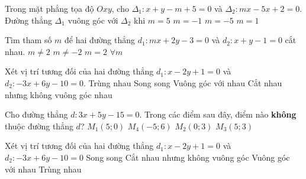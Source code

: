 \begin{ex}%
	Trong mặt phẳng tọa độ $Oxy$, cho $ \Delta_1\colon x+y-m+5=0 $ và $ \Delta_2\colon mx-5x+2=0 $. Đường thẳng $ \Delta_1 $ vuông góc với $ \Delta_2  $ khi
	\choice 
		{\True $  m=5 $}
		{$ m=-1 $} 
		 {$ m=-5 $}
		{$  m=1 $}
\end{ex}

\begin{ex}%
	Tìm tham  số $m$ để hai đường thẳng $d_1\colon mx+2y-3=0$ và $d_2\colon x+y-1=0$ cắt nhau.
	 \choice
		{\True $m \neq 2$} 
		{$m\neq  -2$}
		 {$m=2$}
		{$\forall  m$}
\end{ex}

\begin{ex}%
	Xét vị trí  tương đối của hai đường thẳng $d_1 \colon x-2 y+1=0$ và $d_2 \colon -3 x+6 y-10=0$.
	 \choice
		 {Trùng nhau}
		{\True Song song} 
		{Vuông góc  với nhau}
		{Cắt nhau nhưng không vuông góc  nhau}
\end{ex}

\begin{ex}%
	Cho đường thẳng $d  \colon 3 x+5 y-15=0$. Trong các điểm sau đây, điểm nào \textbf{không} thuộc đường thẳng $d$?
	 \choice
		{$M_1(5; 0)$} 
		 {$M_4(-5; 6)$}
		{$M_2(0;  3)$}
		 {\True $M_3(5; 3)$}
\end{ex}

\begin{ex}%
	Xét vị trí tương đối của hai đường  thẳng $d_1\colon x-2y+1=0$ và $d_2\colon -3x+6y-10=0$
	 \choice
		{\True  Song song}
		 {Cắt nhau nhưng không vuông góc}
		{Vuông góc với nhau} 
		{Trùng  nhau}
\end{ex}


